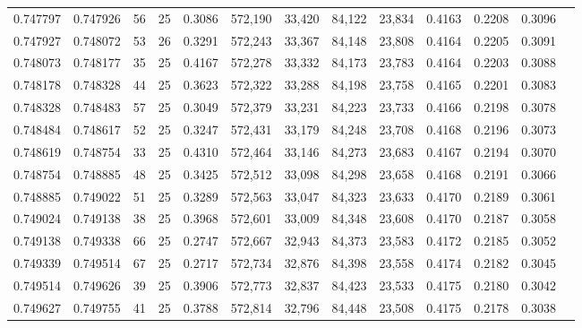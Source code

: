 \begin{tabular}{rrrrrrrrrrrrr}
0.747797 & 0.747926 &    56 &  25 &                                     0.3086 & 572,190 &  33,420 &  84,122 &  23,834 & 0.4163 & 0.2208 & 0.3096 \\
0.747927 & 0.748072 &    53 &  26 &                                     0.3291 & 572,243 &  33,367 &  84,148 &  23,808 & 0.4164 & 0.2205 & 0.3091 \\
0.748073 & 0.748177 &    35 &  25 &                                     0.4167 & 572,278 &  33,332 &  84,173 &  23,783 & 0.4164 & 0.2203 & 0.3088 \\
0.748178 & 0.748328 &    44 &  25 &                                     0.3623 & 572,322 &  33,288 &  84,198 &  23,758 & 0.4165 & 0.2201 & 0.3083 \\
0.748328 & 0.748483 &    57 &  25 &                                     0.3049 & 572,379 &  33,231 &  84,223 &  23,733 & 0.4166 & 0.2198 & 0.3078 \\
0.748484 & 0.748617 &    52 &  25 &                                     0.3247 & 572,431 &  33,179 &  84,248 &  23,708 & 0.4168 & 0.2196 & 0.3073 \\
0.748619 & 0.748754 &    33 &  25 &                                     0.4310 & 572,464 &  33,146 &  84,273 &  23,683 & 0.4167 & 0.2194 & 0.3070 \\
0.748754 & 0.748885 &    48 &  25 &                                     0.3425 & 572,512 &  33,098 &  84,298 &  23,658 & 0.4168 & 0.2191 & 0.3066 \\
0.748885 & 0.749022 &    51 &  25 &                                     0.3289 & 572,563 &  33,047 &  84,323 &  23,633 & 0.4170 & 0.2189 & 0.3061 \\
0.749024 & 0.749138 &    38 &  25 &                                     0.3968 & 572,601 &  33,009 &  84,348 &  23,608 & 0.4170 & 0.2187 & 0.3058 \\
0.749138 & 0.749338 &    66 &  25 &                                     0.2747 & 572,667 &  32,943 &  84,373 &  23,583 & 0.4172 & 0.2185 & 0.3052 \\
0.749339 & 0.749514 &    67 &  25 &                                     0.2717 & 572,734 &  32,876 &  84,398 &  23,558 & 0.4174 & 0.2182 & 0.3045 \\
0.749514 & 0.749626 &    39 &  25 &                                     0.3906 & 572,773 &  32,837 &  84,423 &  23,533 & 0.4175 & 0.2180 & 0.3042 \\
0.749627 & 0.749755 &    41 &  25 &                                     0.3788 & 572,814 &  32,796 &  84,448 &  23,508 & 0.4175 & 0.2178 & 0.3038 \\

\end{tabular}
